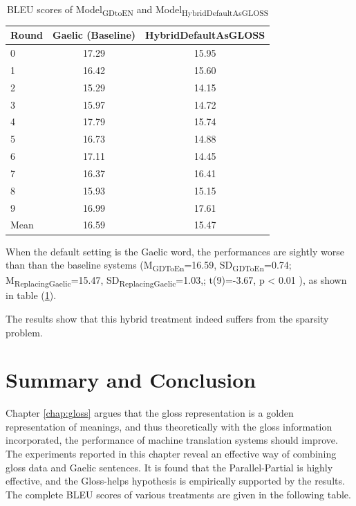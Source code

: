 \documentclass[final]{ua-thesis}
\numberwithin{equation}{section}
\begin{document}
\begin{table}[ht]
\centering
\begin{tabular}{lcc}
  \hline
Round & Gaelic (Baseline) & HybridDefaultAsGLOSS \\ 
  \hline
0 & 17.29 & 15.95 \\ 
  1 & 16.42 & 15.60 \\ 
  2 & 15.29 & 14.15 \\ 
  3 & 15.97 & 14.72 \\ 
  4 & 17.79 & 15.74 \\ 
  5 & 16.73 & 14.88 \\ 
  6 & 17.11 & 14.45 \\ 
  7 & 16.37 & 16.41 \\ 
  8 & 15.93 & 15.15 \\ 
  9 & 16.99 & 17.61 \\ 
   \hline
Mean & 16.59 & 15.47 \\ 
   \hline
\end{tabular}
\caption{BLEU scores of Model\textsubscript{GDtoEN} and Model\textsubscript{HybridDefaultAsGLOSS}} 
\label{Table:HybridDefaultAsGLOSS}
\end{table}When the default setting is the Gaelic word, the performances are sightly worse than than the baseline systems 
(M\textsubscript{GDToEn}=16.59, SD\textsubscript{GDToEn}=0.74; M\textsubscript{ReplacingGaelic}=15.47, SD\textsubscript{ReplacingGaelic}=1.03,; t(9)=-3.67, p < 0.01 ), as shown in table (\ref{Table:HybridDefaultAsGLOSS}).

The results show that this hybrid treatment indeed suffers from the sparsity problem. 

\section{Summary and Conclusion}
Chapter \ref{chap:gloss} argues that the gloss representation is a golden representation of meanings, and thus theoretically with the gloss information incorporated, the performance of machine translation systems should improve. The experiments reported in this chapter reveal an effective way of combining gloss data and Gaelic sentences. It is found that the Parallel-Partial is highly effective, and the Gloss-helps hypothesis is empirically supported by the results. 
The complete BLEU scores of various treatments are given in the following table.
\end{document}

